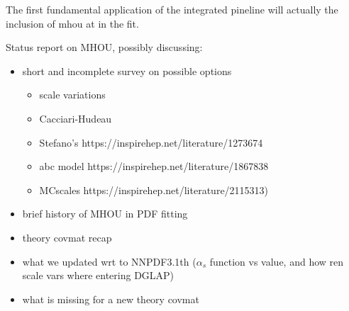 
The first fundamental application of the integrated pineline will actually the
inclusion of \acrfull{mhou} at \nnlo in the  fit.

Status report on MHOU, possibly discussing:
\begin{itemize}
	\item short and incomplete survey on possible options
	\begin{itemize}
		\item scale variations
		\item Cacciari-Hudeau
		\item  Stefano's https://inspirehep.net/literature/1273674
		\item abc model https://inspirehep.net/literature/1867838
		\item MCscales https://inspirehep.net/literature/2115313)
	\end{itemize} 
	\item brief history of MHOU in PDF fitting
	\item theory covmat recap
	\item what we updated wrt to NNPDF3.1th ($\alpha_s$ function vs value, and
		how ren scale vars where entering DGLAP)
	\item what is missing for a new theory covmat
\end{itemize}


